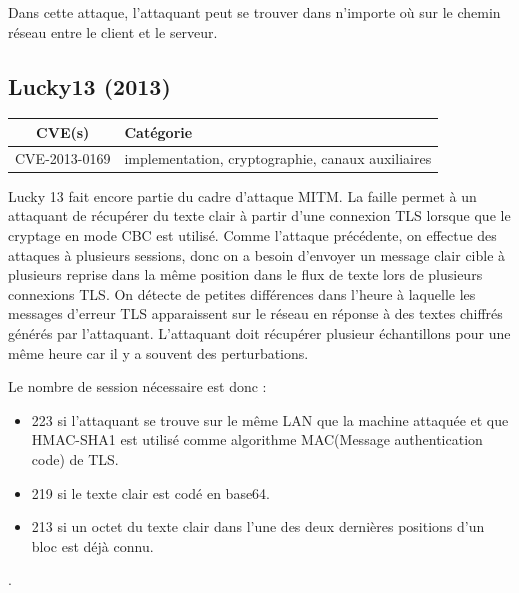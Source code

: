 Dans cette attaque, l'attaquant peut se trouver dans n'importe où sur le chemin réseau entre le client et le serveur\cite{rc4}.




\subsection{Lucky13 (2013)}

\begin{tabularx}{0.96\textwidth}{|c|X|}
  \hline
  \textbf{CVE(s)} & \textbf{Catégorie} \\
  \hline
  CVE-2013-0169 & implementation, cryptographie, canaux auxiliaires \\
  \hline
\end{tabularx}

\vspace{1em}

Lucky 13 fait encore partie du cadre d'attaque MITM. La faille permet à un attaquant de récupérer du texte clair à partir d'une connexion TLS lorsque que le cryptage en mode CBC est utilisé. Comme l'attaque précédente, on effectue des attaques à plusieurs sessions, donc on a besoin d'envoyer un message clair cible à plusieurs reprise dans la même position dans le flux de texte lors de plusieurs connexions TLS. On détecte de petites différences dans l'heure à laquelle les messages d'erreur TLS apparaissent sur le réseau en réponse à des textes chiffrés générés par l'attaquant. L'attaquant doit récupérer plusieur échantillons pour une même heure car il y a souvent des perturbations.

Le nombre de session nécessaire est donc :

\begin{itemize}
\item 223 si l'attaquant se trouve sur le même LAN que la machine attaquée et que HMAC-SHA1 est utilisé comme algorithme MAC(Message authentication code) de TLS.
\item 219 si le texte clair est codé en base64.
\item 213 si un octet du texte clair dans l'une des deux dernières positions d'un bloc est déjà connu.
\end{itemize}
\cite{lucky13}.




